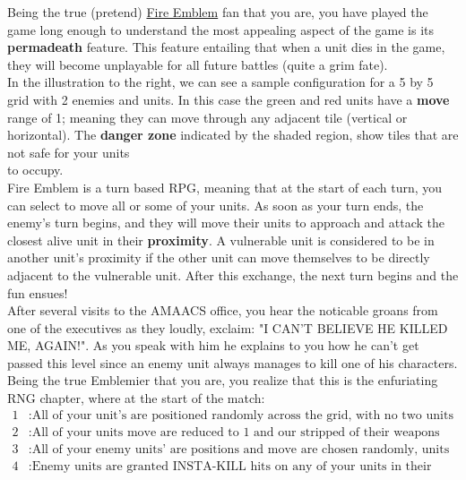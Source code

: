 

\noindent Being the true (pretend) \href{https://en.wikipedia.org/wiki/Fire_Emblem}{Fire Emblem} fan  that
you are, you have played the game long enough to understand the most appealing aspect of the game is its
\textbf{permadeath} feature.  This feature entailing that when a unit dies in the game, they will become unplayable for all
future battles (quite a grim fate). \\

\noindent In the illustration to the right, we can see a sample configuration for a 5 by 5 grid with 2 enemies and
units. In this case the green and red units have a \textbf{move} range of 1; meaning they can move through any adjacent tile
(vertical or horizontal). The \textbf{danger zone} indicated by the shaded region, show tiles that are not safe for
your units \\ to occupy. \\

\noindent  Fire Emblem is a turn based RPG, meaning that at the start of each turn, you can select to move all or some
of your units. As soon as your turn ends, the enemy's turn begins, and they will move their units to approach and
attack the closest alive unit in their \textbf{proximity}.  A vulnerable unit is considered to be in another unit's
proximity if the other unit can move themselves to be directly adjacent to the vulnerable unit. After this exchange,
the next turn begins and the fun ensues!\\


\noindent After several visits to the AMAACS office, you hear the noticable groans from one of the executives as they
loudly, exclaim: "I CAN'T BELIEVE HE KILLED ME, AGAIN!". As you speak with him he explains to you how he can't get
passed this level since an enemy unit always manages to kill one of his characters.  Being the true Emblemier that you
are, you realize that this is the enfuriating RNG chapter, where at the start of the match:
\begin{align*}
1 &: \text{All of your unit's are positioned randomly across the grid, with no two units being adjacent.}\\
2 &: \text{All of your units move are reduced to 1 and our stripped of their weapons for the duration of this turn.} \\
3 &: \text{All of your enemy units' are positions and move are chosen randomly, units may be adjacent with your own} \\
4 &: \text{Enemy units are granted INSTA-KILL hits on any of your units in their proximity}
\end{align*}

